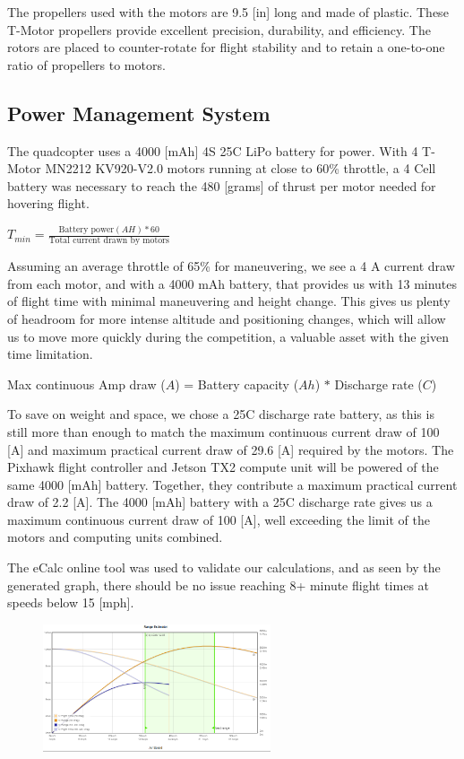 \documentclass[12pt,letterpaper]{article}
\begin{document}
The propellers used with the motors are 9.5 [in] long and made of plastic. These T-Motor propellers provide excellent precision, durability, and efficiency. The rotors are placed to counter-rotate for flight stability and to retain a one-to-one ratio of propellers to motors.

	\subsection*{Power Management System}
The quadcopter uses a 4000 [mAh] 4S 25C LiPo battery for power. With 4 T-Motor MN2212 KV920-V2.0  motors running at close to 60\% throttle, a 4 Cell battery was necessary to reach the 480 [grams] of thrust per motor needed for hovering flight.
\begin{center}
	$T_{min} = \frac{\text{Battery power}(AH) * 60}{\text{Total current drawn by motors}}$
\end{center}

Assuming an average throttle of 65\% for maneuvering, we see a 4 A current draw from each motor, and with a 4000 mAh battery, that provides us with 13 minutes of flight time with minimal maneuvering and height change. This gives us plenty of headroom for more intense altitude and positioning changes, which will allow us to move more quickly during the competition, a valuable asset with the given time limitation.
\begin{center}
	Max continuous Amp draw ($A$) = Battery capacity ($Ah$) $*$ Discharge rate ($C$)
\end{center}

To save on weight and space, we chose a 25C discharge rate battery, as this is still more than enough to match the maximum continuous current draw of 100 [A] and maximum practical current draw of 29.6 [A] required by the motors. The Pixhawk flight controller and Jetson TX2 compute unit will be powered of the same 4000 [mAh] battery. Together, they contribute a maximum practical current draw of 2.2 [A]. The 4000 [mAh] battery with a 25C discharge rate gives us a maximum continuous current draw of 100 [A], well exceeding the limit of the motors and computing units combined.

The eCalc online tool was used to validate our calculations, and as seen by the generated graph, there should be no issue reaching 8+ minute flight times at speeds below 15 [mph].

		\begin{figure}[!htbp]
			\begin{center}
				\includegraphics[width=0.6\textwidth]{powerGraph}
			\end{center}
		\end{figure}
\end{document}

